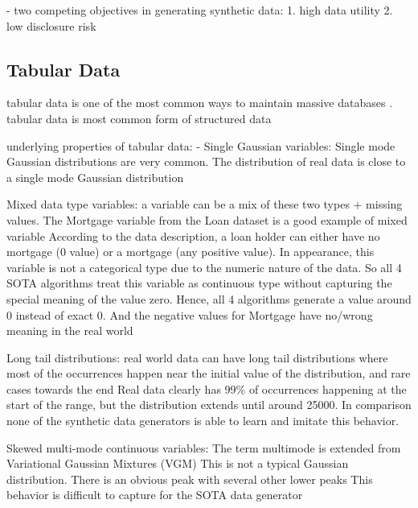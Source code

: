 
- two competing objectives in generating synthetic data: \cite{little2021GenerativeAdversarialNetworksa}
    1. high data utility \cite{little2021GenerativeAdversarialNetworksa}
    2. low disclosure risk \cite{little2021GenerativeAdversarialNetworksa}


\subsection{Tabular Data}
\label{ch:preliminaries-dataSynthesis-tabularData}

tabular data is one of the most common ways to maintain massive databases \cite{esmaeilpour2022BidiscriminatorGANTabular}.
tabular data is most common form of structured data \cite{hernandez2022SyntheticDataGeneration}

underlying properties of tabular data: \cite{zhao2022CTABGANEnhancingTabular}
- Single Gaussian variables:
    Single mode Gaussian distributions are very common.
    The distribution of real data is close to a single mode Gaussian distribution

Mixed data type variables:\cite{zhao2022CTABGANEnhancingTabular}
    a variable can be a mix of these two types + missing values. The Mortgage variable from the Loan dataset is a good example of mixed variable
    According to the data description, a loan holder can either have no mortgage (0 value) or a mortgage (any positive value). 
    In appearance, this variable is not a categorical type due to the numeric nature of the data. 
    So all 4 SOTA algorithms treat this variable as continuous type without capturing the special meaning of the value zero. 
    Hence, all 4 algorithms generate a value around 0 instead of exact 0. And the negative values for Mortgage have no/wrong meaning in the real world

Long tail distributions:\cite{zhao2022CTABGANEnhancingTabular}
    real world data can have long tail distributions where most of the occurrences happen near the initial value of the distribution, and rare cases towards the end
    Real data clearly has 99\% of occurrences happening at the start of the range, 
    but the distribution extends until around 25000. 
    In comparison none of the synthetic data generators is able to learn and imitate this behavior.

Skewed multi-mode continuous variables:\cite{zhao2022CTABGANEnhancingTabular}
    The term multimode is extended from Variational Gaussian Mixtures (VGM)
    This is not a typical Gaussian distribution. There is an obvious peak
    with several other lower peaks
    This behavior is difficult to capture for the SOTA data generator




